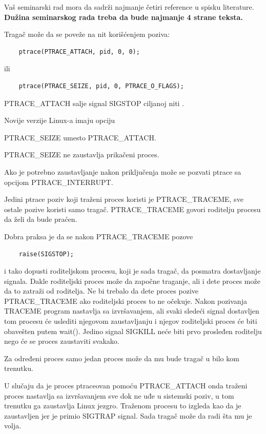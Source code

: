 \documentclass[a4paper]{article}
\begin{document}
Vaš seminarski rad mora da sadrži najmanje četiri reference u spisku literature. 
\textbf{Dužina seminarskog rada treba da bude najmanje 4 strane teksta.}

Tragač može da se poveže na nit korišćenjem poziva:

\begin{verbatim}
    ptrace(PTRACE_ATTACH, pid, 0, 0);
\end{verbatim}
ili
\begin{verbatim}
    ptrace(PTRACE_SEIZE, pid, 0, PTRACE_O_FLAGS);
\end{verbatim}

PTRACE\_ATTACH salje signal SIGSTOP ciljanoj niti \cite{man}. 

Novije verzije Linux-a imaju opciju 

PTRACE\_SEIZE umesto PTRACE\_ATTACH. 

PTRACE\_SEIZE ne zaustavlja prikačeni proces.

Ako je potrebno zaustavljanje nakon priključenja može se pozvati ptrace sa opcijom PTRACE\_INTERRUPT.

Jedini ptrace poziv koji traženi proces koristi je PTRACE\_TRACEME, sve ostale pozive koristi samo tragač.
PTRACE\_TRACEME govori roditelju procesu da želi da bude praćen.

Dobra praksa je da se nakon PTRACE\_TRACEME pozove 
\begin{verbatim}
    raise(SIGSTOP);
\end{verbatim}
i tako dopusti roditeljskom procesu, koji je sada tragač, da posmatra dostavljanje signala.
Dakle roditeljski proces može da započne traganje, ali i dete proces može da to zatraži od roditelja.
Ne bi trebalo da dete proces pozive PTRACE\_TRACEME ako roditeljski proces to ne očekuje. 
Nakon pozivanja TRACEME program nastavlja sa izvršavanjem, ali svaki sledeći signal dostavljen tom procesu
će uslediti njegovom zaustavljanju i njegov roditeljski proces će biti obavešten putem wait(). 
Jedino signal SIGKILL neće biti prvo prosleđen roditelju nego će se proces zaustaviti svakako.

Za određeni proces samo jedan proces može da mu bude tragač u bilo kom trenutku.

U slučaju da je proces ptraceovan pomoću PTRACE\_ATTACH onda traženi proces nastavlja sa izvršavanjem sve dok ne
uđe u sistemski poziv, u tom trenutku ga zaustavlja Linux jezgro. Traženom procesu to izgleda kao da je zaustavljen
jer je primio SIGTRAP signal. Sada tragač može da radi šta mu je volja.
\end{document}
